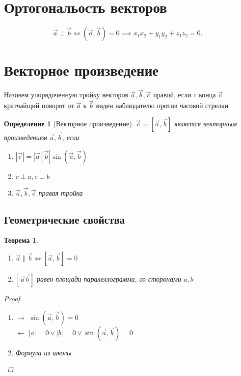 \documentclass{scrartcl}
\newtheorem{theorem}{Теорема}
\newtheorem{definition}{Определение}
\begin{document}
    \section{Ортогональость векторов}
    \[
    \vec{a} \perp \vec{b} \iff (\vec{a},\vec{b}) = 0 \implies x_1x_2 +y_1y_2 +z_1z_2 = 0
    .\] 
    \section{Векторное произведение}
    Назовем упорядоченную тройку векторов $\vec{a},\vec{b},\vec{c}$ правой, если
    c конца $\vec{c}$ кратчайщий поворот от $\vec{a}$ к $\vec{b}$ виден наблюдателю против часовой стрелки
    \begin{definition}[Векторное произведение]
        $\vec{c} = [\vec{a},\vec{b}]$ является векторным произведением $\vec{a},\vec{b}$, если
        \begin{enumerate}
            \item $|\vec{c}| = |\vec{a}||\vec{b}| \sin{(\vec{a},\vec{b})}$
            \item $c \perp a, c \perp b$
            \item  $\vec{a} ,\vec{b} ,\vec{c}$ правая тройка
        \end{enumerate}
    \end{definition}
    \subsection{Геометрические свойства}
    \begin{theorem}
        \begin{enumerate}
            \item $\vec{a} \parallel \vec{b} \iff [\vec{a},\vec{b}] = 0$
            \item $[\vec{a}\vec{b}]$ равен площади паралеллограмма, со сторонами $a,b$
        \end{enumerate}
        \begin{proof}
            \begin{enumerate}
                \item $\rightarrow$  $\sin{( \vec{a},\vec{b} )} = 0$\\
                    $\leftarrow$  $|a| = 0 \lor |b| = 0 \lor \sin{(\vec{a},\vec{b})} = 0$
                    \item
                        Формула из школы
            \end{enumerate}
        \end{proof}
    \end{theorem}
\end{document}
